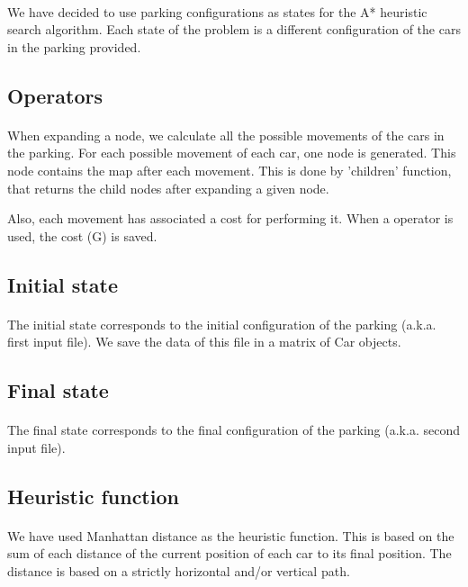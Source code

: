 \paragraph{}
We have decided to use parking configurations as states for the A* heuristic
search algorithm.
Each state of the problem is a different configuration of the cars in the parking
provided.


\subsection{Operators}

\paragraph{}
When expanding a node, we calculate all the possible movements of the cars in
the parking. For each possible movement of each car, one node is generated. This
node contains the map after each movement. This is done by 'children' function,
that returns the child nodes after expanding a given node.

Also, each movement has associated a cost for performing it. When a operator is
used, the cost (G) is saved.

\subsection{Initial state}

\paragraph{}
The initial state corresponds to the initial configuration of the parking
(a.k.a. first input file).
We save the data of this file in a matrix of Car objects.

\subsection{Final state}

\paragraph{}
The final state corresponds to the final configuration of the parking
(a.k.a. second input file).


\subsection{Heuristic function}

\paragraph{}
We have used Manhattan distance as the heuristic function. This is based on the
sum of each distance of the current position of each car to its final position.
The distance is based on a strictly horizontal and/or vertical path.
